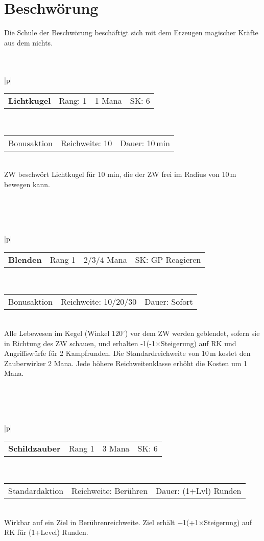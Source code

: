 \documentclass[../../Heldenanleitung2]{subfiles}
\begin{document}
\section{Beschwörung}

Die Schule der Beschwörung beschäftigt sich mit dem Erzeugen magischer Kräfte aus dem nichts.
\\\\\\
\begin{tabular}{|p{\textwidth}|}
\hline
\begin{tabularx}{\textwidth}{X|X|X|X}
\textbf{Lichtkugel} & Rang: 1 & 1 Mana & SK: 6
\end{tabularx} \\ \hline
\begin{tabularx}{\textwidth}{X|X|X}
Bonusaktion & Reichweite: 10 & Dauer: 10\,min
\end{tabularx} \\ \hline
ZW beschwört Lichtkugel für 10 min, die der ZW frei im Radius von 10\,m bewegen kann.
\\ \hline
\end{tabular}
\\\\\\
\begin{tabular}{|p{\textwidth}|}
\hline
\begin{tabularx}{\textwidth}{X|X|X|X}
\textbf{Blenden} & Rang 1 & 2/3/4 Mana & SK: GP Reagieren
\end{tabularx} \\ \hline
\begin{tabularx}{\textwidth}{X|X|X}
Bonusaktion & Reichweite: 10/20/30 & Dauer: Sofort
\end{tabularx} \\ \hline
Alle Lebewesen im Kegel (Winkel $120^\circ$) vor dem ZW werden geblendet, sofern sie in Richtung des ZW schauen, und erhalten -1(-1$\times$Steigerung) auf RK und Angriffswürfe für 2 Kampfrunden. Die Standardreichweite von 10\,m kostet den Zauberwirker 2 Mana. Jede höhere Reichweitenklasse erhöht die Kosten um 1 Mana.
\\ \hline
\end{tabular}
\\\\\\
\begin{tabular}{|p{\textwidth}|}
\hline
\begin{tabularx}{\textwidth}{X|X|X|X}
\textbf{Schildzauber} & Rang 1 & 3 Mana & SK: 6
\end{tabularx} \\ \hline
\begin{tabularx}{\textwidth}{X|X|X}
Standardaktion & Reichweite: Berühren & Dauer: (1+Lvl) Runden
\end{tabularx} \\ \hline
Wirkbar auf ein Ziel in Berührenreichweite. Ziel erhält +1(+1$\times$Steigerung) auf RK für (1+Level) Runden.
\\ \hline
\end{tabular}
\end{document}

